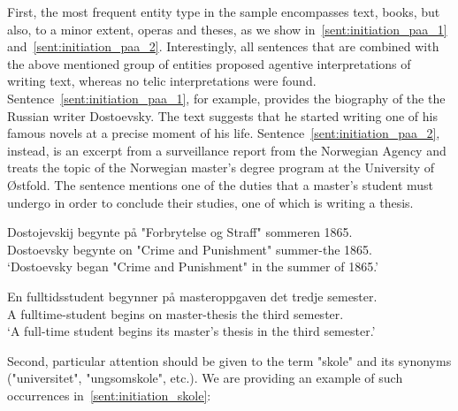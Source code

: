 \documentclass{article}
\begin{document}
First, the most frequent entity type in the sample encompasses text, books, but also, to a minor extent, operas and theses, as we show in~\ref{sent:initiation_paa_1} and~\ref{sent:initiation_paa_2}. Interestingly, all sentences that are combined with the above mentioned group of entities proposed agentive interpretations of writing text, whereas no telic interpretations were found. Sentence~\ref{sent:initiation_paa_1}, for example, provides the biography of the the Russian writer Dostoevsky. The text suggests that he started writing one of his famous novels at a precise moment of his life. Sentence~\ref{sent:initiation_paa_2}, instead, is an excerpt from a surveillance report from the Norwegian Agency and treats the topic of the Norwegian master's degree program at the University of Østfold. The sentence mentions one of the duties that a master's student must undergo in order to conclude their studies, one of which is writing a thesis. 

    \ea \label{sent:initiation_paa_1} %

    \gll Dostojevskij begynte på "Forbrytelse og Straff" sommeren 1865.\\
         Dostoevsky   begynte on "Crime and Punishment" summer-the 1865.\\
    \glt ‘Dostoevsky began "Crime and Punishment" in the summer of 1865.’
    \z

    \ea \label{sent:initiation_paa_2} %

    \gll En fulltidsstudent begynner på masteroppgaven det tredje semester.\\
         A fulltime-student begins on master-thesis the third semester.\\
    \glt ‘A full-time student begins its master's thesis in the third semester.’
    \z
    
Second, particular attention should be given to the term "skole" and its synonyms ("universitet", "ungsomskole", etc.). We are providing an example of such occurrences in~\ref{sent:initiation_skole}:
        \ea \label{initiation_skole} %
\end{document}
